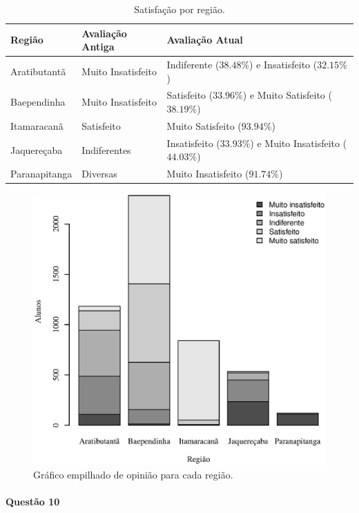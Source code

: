 \documentclass[10pt,a4paper,oneside]{article}
\newcommand{\arat}{Aratibutantã\xspace}
\newcommand{\baep}{Baependinha\xspace}
\newcommand{\itam}{Itamaracanã\xspace}
\newcommand{\jaqu}{Jaquereçaba\xspace}
\newcommand{\para}{Paranapitanga\xspace}
\begin{document}
\begin{table}[!h]
	\centering
	\caption{Satisfação por região.}
	\vspace{0.5em}
	\label{table:satisfacao-regiao}
	\begin{tabular}{l l l}
		\toprule
		\textbf{Região} & \textbf{Avaliação Antiga} & \textbf{Avaliação Atual}                \\
		\midrule
		\arat  & Muito Insatisfeito & Indiferente ($38.48\%$) e Insatisfeito ($32.15\%$)      \\
		\baep  & Muito Insatisfeito & Satisfeito ($33.96\%$) e Muito Satisfeito ($38.19\%$)   \\
		\itam  & Satisfeito         & Muito Satisfeito ($93.94\%$)                            \\
		\jaqu  & Indiferentes       & Insatisfeito ($33.93\%$) e Muito Insatisfeito ($44.03\%$) \\
		\para  & Diversas           & Muito Insatisfeito ($91.74\%$)                          \\
		\bottomrule
	\end{tabular}
\end{table}

\begin{figure}[!h]
	\centering
	\includegraphics[width=.75\linewidth]{plots/stacked_opiniao_por_regiao.eps}
	\caption{Gráfico empilhado de opinião para cada região.}
	\label{fig:stacked-opiniao-por-regiao}
\end{figure}

\FloatBarrier
\paragraph{Questão 10}
\end{document}
